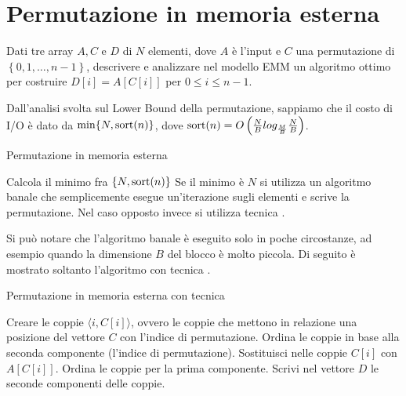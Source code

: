 \chapter{Permutazione in memoria esterna}

\begin{problem*}
    Dati tre array \(A, C\) e \(D\) di \(N\) elementi, dove \(A\) \`e l'input e 
    \(C\) una permutazione di \(\left\{0,1,\dots ,n-1\right\}\), descrivere e
    analizzare nel modello EMM un algoritmo ottimo per costruire
    \(D[i]=A[C[i]]\) per \(0\le i\le n-1\).
\end{problem*}

Dall'analisi svolta sul Lower Bound della permutazione, sappiamo che il costo di
I/O è dato da \(\min\{N, \mbox{sort}(n)\}\), dove \(\mbox{sort}(n) =
O\left(\frac{N}{B}log_\frac{M}{B} \frac{N}{B}\right)\).
 
\begin{algorithm}
    \caption{Permutazione in memoria esterna}
    \begin{algorithmic}[1]
        \State Calcola il minimo fra \(\{N, \mbox{sort}(n)\}\)
        \State Se il minimo è \(N\) si utilizza un algoritmo banale che semplicemente esegue un'iterazione sugli elementi e scrive la permutazione.
        \State Nel caso opposto invece si utilizza tecnica \mapreduce.
    \end{algorithmic}	
\end{algorithm}

Si può notare che l'algoritmo banale è eseguito solo in poche circostanze,
ad esempio quando la dimensione \(B\) del blocco è molto piccola. Di seguito
è mostrato soltanto l'algoritmo con tecnica \mapreduce.
 
\begin{algorithm}
    \caption{Permutazione in memoria esterna con tecnica \mapreduce}
    \begin{algorithmic}[1]
        \State Creare le coppie \(\langle i,C[i] \rangle\), ovvero le coppie che mettono in relazione una posizione del vettore \(C\) con l'indice di permutazione.
        \State Ordina le coppie in base alla seconda componente (l'indice di permutazione).
        \State Sostituisci nelle coppie \(C[i]\) con \(A[C[i]]\).
        \State Ordina le coppie per la prima componente.
        \State Scrivi nel vettore \(D\) le seconde componenti delle coppie.
    \end{algorithmic}	
\end{algorithm}

